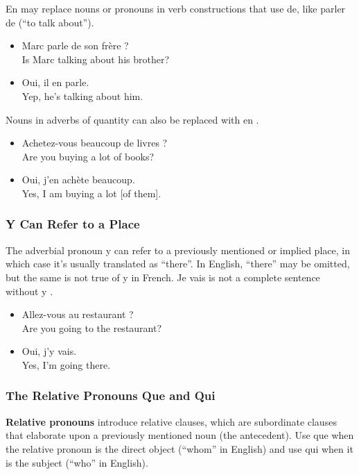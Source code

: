 \guillemotleft En \guillemotright may replace nouns or pronouns in verb constructions that use de, like parler de (``to talk about'').

\begin{itemize}
  \item  Marc parle de son fr{\`e}re ? \\ Is Marc talking about his brother?
  \item  Oui, il en parle. \\ Yep, he's talking about him.
\end{itemize}

Nouns in adverbs of quantity can also be replaced with \guillemotleft en \guillemotright .

\begin{itemize}
  \item  Achetez-vous beaucoup de livres ? \\ Are you buying a lot of books?
  \item  Oui, j'en ach{\`e}te beaucoup. \\ Yes, I am buying a lot [of them].
\end{itemize}

\subsubsection{Y Can Refer to a Place}

The adverbial pronoun \guillemotleft y \guillemotright can refer to a previously mentioned or implied place, in which case it's usually translated as ``there''.  In English, ``there'' may be omitted, but the same is not true of \guillemotleft y \guillemotright in French. \guillemotleft Je vais \guillemotright is not a complete sentence without \guillemotleft y \guillemotright .

\begin{itemize}
  \item  Allez-vous au restaurant ? \\ Are you going to the restaurant?
  \item  Oui, j'y vais. \\ Yes, I'm going there.
\end{itemize}

\subsubsection{The Relative Pronouns Que and Qui}

\textbf{Relative pronouns} introduce relative clauses, which are subordinate clauses that elaborate upon a previously mentioned noun (the antecedent). Use \guillemotleft que \guillemotright when the relative pronoun is the direct object (``whom'' in English) and use \guillemotleft qui \guillemotright when it is the subject (``who'' in English).

